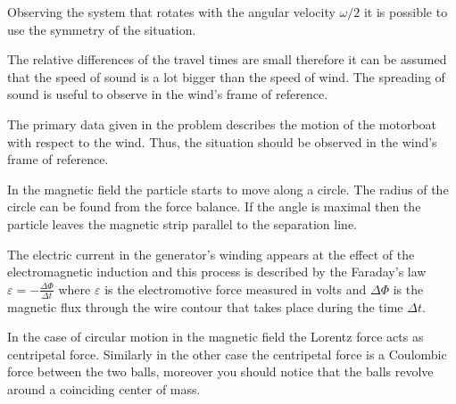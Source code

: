 \documentclass[11pt]{article}
\begin{document}

\hinteng
Observing the system that rotates with the angular velocity $\omega/2$ it is possible to use the symmetry of the situation.
\probend
\bigskip


\hinteng
The relative differences of the travel times are small therefore it can be assumed that the speed of sound is a lot bigger than the speed of wind. The spreading of sound is useful to observe in the wind’s frame of reference.
\probend
\bigskip


\hinteng
The primary data given in the problem describes the motion of the motorboat with respect to the wind. Thus, the situation should be observed in the wind’s frame of reference.
\probend
\bigskip


\hinteng
In the magnetic field the particle starts to move along a circle. The radius of the circle can be found from the force balance. If the angle is maximal then the particle leaves the magnetic strip parallel to the separation line.
\probend
\bigskip


\hinteng
The electric current in the generator’s winding appears at the effect of the electromagnetic induction and this process is described by the Faraday’s law $\varepsilon = -\frac{\Delta\Phi}{\Delta t}$ where $\varepsilon$ is the electromotive force measured in volts and $\Delta\Phi$ is the magnetic flux through the wire contour that takes place during the time $\Delta t$.
\probend
\bigskip


\hinteng
In the case of circular motion in the magnetic field the Lorentz force acts as centripetal force. Similarly in the other case the centripetal force is a Coulombic force between the two balls, moreover you should notice that the balls revolve around a coinciding center of mass.
\probend
\bigskip
\end{document}
